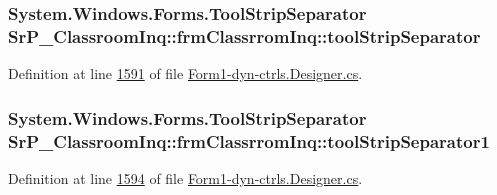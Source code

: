 \hypertarget{class_sr_p___classroom_inq_1_1frm_classrrom_inq_a442caa4a21bb4dac8b91d82e24bec584}{
\subsubsection[{tool\-Strip\-Separator}]{\setlength{\rightskip}{0pt plus 5cm}\-System.\-Windows.\-Forms.\-Tool\-Strip\-Separator {\bf \-Sr\-P\-\_\-\-Classroom\-Inq\-::frm\-Classrrom\-Inq\-::tool\-Strip\-Separator}}}
\label{class_sr_p___classroom_inq_1_1frm_classrrom_inq_a442caa4a21bb4dac8b91d82e24bec584}


\-Definition at line \hyperlink{_form1-dyn-ctrls_8_designer_8cs_source_l01591}{1591} of file \hyperlink{_form1-dyn-ctrls_8_designer_8cs_source}{\-Form1-\/dyn-\/ctrls.\-Designer.\-cs}.

\hypertarget{class_sr_p___classroom_inq_1_1frm_classrrom_inq_a3bec3b534d141382d4525a9be840e911}{
\subsubsection[{tool\-Strip\-Separator1}]{\setlength{\rightskip}{0pt plus 5cm}\-System.\-Windows.\-Forms.\-Tool\-Strip\-Separator {\bf \-Sr\-P\-\_\-\-Classroom\-Inq\-::frm\-Classrrom\-Inq\-::tool\-Strip\-Separator1}}}
\label{class_sr_p___classroom_inq_1_1frm_classrrom_inq_a3bec3b534d141382d4525a9be840e911}


\-Definition at line \hyperlink{_form1-dyn-ctrls_8_designer_8cs_source_l01594}{1594} of file \hyperlink{_form1-dyn-ctrls_8_designer_8cs_source}{\-Form1-\/dyn-\/ctrls.\-Designer.\-cs}.

